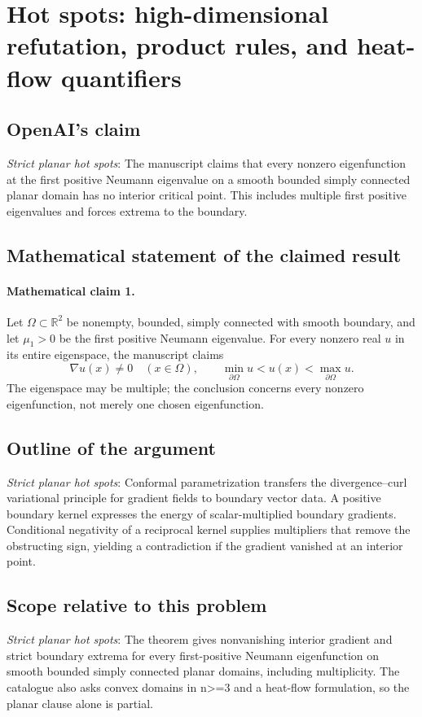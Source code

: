 \documentclass[11pt]{article}
\begin{document}
\section*{Hot spots: high-dimensional refutation, product rules, and heat-flow quantifiers}

\subsection{OpenAI's claim}
\textit{Strict planar hot spots}: The manuscript claims that every nonzero eigenfunction at the first positive Neumann eigenvalue on a smooth bounded simply connected planar domain has no interior critical point. This includes multiple first positive eigenvalues and forces extrema to the boundary.

\subsection{Mathematical statement of the claimed result}
\paragraph{Mathematical claim 1.} Let $\Omega\subset\mathbb R^2$ be nonempty, bounded, simply connected with smooth boundary, and let $\mu_1>0$ be the first positive Neumann eigenvalue. For every nonzero real $u$ in its entire eigenspace, the manuscript claims \[\nabla u(x)\ne0\quad(x\in\Omega),\qquad\min_{\partial\Omega}u<u(x)<\max_{\partial\Omega}u.\] The eigenspace may be multiple; the conclusion concerns every nonzero eigenfunction, not merely one chosen eigenfunction.

\subsection{Outline of the argument}
\textit{Strict planar hot spots}: Conformal parametrization transfers the divergence--curl variational principle for gradient fields to boundary vector data. A positive boundary kernel expresses the energy of scalar-multiplied boundary gradients. Conditional negativity of a reciprocal kernel supplies multipliers that remove the obstructing sign, yielding a contradiction if the gradient vanished at an interior point.

\subsection{Scope relative to this problem}
\textit{Strict planar hot spots}: The theorem gives nonvanishing interior gradient and strict boundary extrema for every first-positive Neumann eigenfunction on smooth bounded simply connected planar domains, including multiplicity. The catalogue also asks convex domains in n>=3 and a heat-flow formulation, so the planar clause alone is partial.
\end{document}
